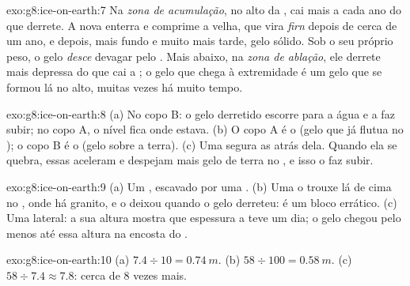 \begin{solution}{exo:g8:ice-on-earth:7}
Na \emph{zona de acumulação}, no alto da , cai mais  a cada
ano do que derrete. A  nova enterra e comprime a  velha, que vira
\emph{firn} depois de cerca de um ano, e depois, mais fundo e muito mais
tarde, gelo sólido. Sob o seu próprio peso, o gelo \emph{desce} devagar
pelo . Mais abaixo, na \emph{zona de ablação}, ele derrete mais
depressa do que cai a ; o gelo que chega à extremidade é um gelo que
se formou lá no alto, muitas vezes há muito tempo.
\end{solution}

\begin{solution}{exo:g8:ice-on-earth:8}
(a) No copo B: o gelo derretido escorre para a água e a faz subir; no copo
A, o nível fica onde estava. (b) O copo A é o  (gelo que já flutua
no ); o copo B é o  (gelo sobre a terra). (c) Uma
 segura as  atrás dela. Quando ela se quebra,
essas  aceleram e despejam mais gelo de terra no , e isso o
faz subir.
\end{solution}

\begin{solution}{exo:g8:ice-on-earth:9}
(a) Um , escavado por uma . (b) Uma  o trouxe lá
de cima no , onde há granito, e o deixou quando o gelo derreteu: é um
bloco errático. (c) Uma  lateral: a sua altura mostra que espessura
a  teve um dia; o gelo chegou pelo menos até essa altura na
encosta do .
\end{solution}

\begin{solution}{exo:g8:ice-on-earth:10}
(a) $7.4 \div 10 = \qty{0.74}{m}$. (b) $58 \div 100 = \qty{0.58}{m}$.
(c) $58 \div 7.4 \approx 7.8$: cerca de 8 vezes mais.
\end{solution}

